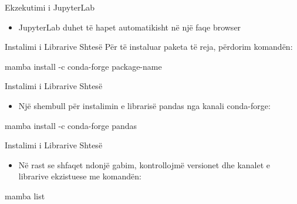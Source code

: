 \documentclass[
  ignorenonframetext,
]{beamer}
\newenvironment{Shaded}{\begin{snugshade}}{\end{snugshade}}
\newcommand{\NormalTok}[1]{#1}
\providecommand{\tightlist}{%
  \setlength{\itemsep}{0pt}\setlength{\parskip}{0pt}}
\begin{document}
\begin{frame}{Ekzekutimi i JupyterLab}
\protect\hypertarget{ekzekutimi-i-jupyterlab-1}{}
\begin{itemize}
\tightlist
\item
  JupyterLab duhet të hapet automatikisht në një faqe browser
\end{itemize}
\end{frame}

\begin{frame}[fragile]{Instalimi i Librarive Shtesë}
\protect\hypertarget{instalimi-i-librarive-shtesuxeb}{}
Për të instaluar paketa të reja, përdorim komandën:

\begin{Shaded}
\begin{Highlighting}[]
\NormalTok{mamba install {-}c conda{-}forge package{-}name}
\end{Highlighting}
\end{Shaded}
\end{frame}

\begin{frame}[fragile]{Instalimi i Librarive Shtesë}
\protect\hypertarget{instalimi-i-librarive-shtesuxeb-1}{}
\begin{itemize}
\tightlist
\item
  Një shembull për instalimin e librarisë pandas nga kanali conda-forge:
\end{itemize}

\begin{Shaded}
\begin{Highlighting}[]
\NormalTok{mamba install {-}c conda{-}forge pandas}
\end{Highlighting}
\end{Shaded}
\end{frame}

\begin{frame}[fragile]{Instalimi i Librarive Shtesë}
\protect\hypertarget{instalimi-i-librarive-shtesuxeb-2}{}
\begin{itemize}
\tightlist
\item
  Në rast se shfaqet ndonjë gabim, kontrollojmë versionet dhe kanalet e
  librarive ekzistuese me komandën:
\end{itemize}

\begin{Shaded}
\begin{Highlighting}[]
\NormalTok{mamba list}
\end{Highlighting}
\end{Shaded}
\end{frame}
\end{document}
